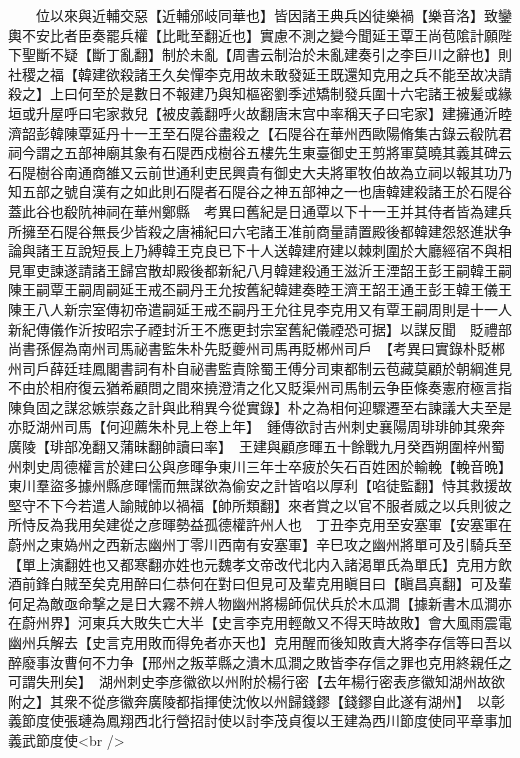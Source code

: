 　　位以來與近輔交惡【近輔邠岐同華也】皆因諸王典兵凶徒樂禍【樂音洛】致鑾輿不安比者臣奏罷兵權【比毗至翻近也】實慮不測之變今聞延王覃王尚苞隂計願陛下聖斷不疑【斷丁亂翻】制於未亂【周書云制治於未亂建奏引之李巨川之辭也】則社稷之福【韓建欲殺諸王久矣憚李克用故未敢發延王既還知克用之兵不能至故决請殺之】上曰何至於是數日不報建乃與知樞密劉季述矯制發兵圍十六宅諸王被髪或緣垣或升屋呼曰宅家救兒【被皮義翻呼火故翻唐末宫中率稱天子曰宅家】建擁通沂睦濟韶彭韓陳覃延丹十一王至石隄谷盡殺之【石隄谷在華州西歐陽脩集古錄云殽阬君祠今謂之五部神廟其象有石隄西戍樹谷五樓先生東臺御史王剪將軍莫曉其義其碑云石隄樹谷南通商雒又云前世通利吏民興貴有御史大夫將軍牧伯故為立祠以報其功乃知五部之號自漢有之如此則石隄者石隄谷之神五部神之一也唐韓建殺諸王於石隄谷蓋此谷也殽阬神祠在華州鄭縣　考異曰舊紀是日通覃以下十一王并其侍者皆為建兵所擁至石隄谷無長少皆殺之唐補紀曰六宅諸王准前商量請置殿後都韓建怨怒進狀争論與諸王互說短長上乃縛韓王克良已下十人送韓建府建以棘刺圍於大廳經宿不與相見軍吏諫遂請諸王歸宫散却殿後都新紀八月韓建殺通王滋沂王湮韶王彭王嗣韓王嗣陳王嗣覃王嗣周嗣延王戒丕嗣丹王允按舊紀韓建奏睦王濟王韶王通王彭王韓王儀王陳王八人新宗室傳初帝遣嗣延王戒丕嗣丹王允往見李克用又有覃王嗣周則是十一人新紀傳儀作沂按昭宗子禋封沂王不應更封宗室舊紀儀禋恐可据】以謀反聞　貶禮部尚書孫偓為南州司馬祕書監朱朴先貶夔州司馬再貶郴州司戶　【考異曰實錄朴貶郴州司戶薛廷珪鳳閣書詞有朴自祕書監責除蜀王傅分司東都制云苞藏莫顧於朝綱進見不由於相府復云猶希顧問之間來撓澄清之化又貶渠州司馬制云争臣條奏憲府極言指陳負固之謀忿嫉崇姦之計與此稍異今從實錄】朴之為相何迎驟遷至右諫議大夫至是亦貶湖州司馬【何迎薦朱朴見上卷上年】　鍾傳欲討吉州刺史襄陽周琲琲帥其衆奔廣陵【琲部凂翻又蒲昧翻帥讀曰率】　王建與顧彦暉五十餘戰九月癸酉朔圍梓州蜀州刺史周德權言於建曰公與彦暉争東川三年士卒疲於矢石百姓困於輸輓【輓音晩】東川羣盜多據州縣彦暉懦而無謀欲為偷安之計皆啗以厚利【啗徒監翻】恃其救援故堅守不下今若遣人諭賊帥以禍福【帥所類翻】來者賞之以官不服者威之以兵則彼之所恃反為我用矣建從之彦暉勢益孤德權許州人也　丁丑李克用至安塞軍【安塞軍在蔚州之東媯州之西新志幽州丁零川西南有安塞軍】辛巳攻之幽州將單可及引騎兵至【單上演翻姓也又都寒翻亦姓也元魏孝文帝改代北内入諸渇單氏為單氏】克用方飲酒前鋒白賊至矣克用醉曰仁恭何在對曰但見可及輩克用瞋目曰【瞋昌真翻】可及輩何足為敵亟命撃之是日大霧不辨人物幽州將楊師侃伏兵於木瓜澗【據新書木瓜澗亦在蔚州界】河東兵大敗失亡大半【史言李克用輕敵又不得天時故敗】會大風雨震電幽州兵解去【史言克用敗而得免者亦天也】克用醒而後知敗責大將李存信等曰吾以醉廢事汝曹何不力争【邢州之叛莘縣之潰木瓜澗之敗皆李存信之罪也克用終親任之可謂失刑矣】　湖州刺史李彦徽欲以州附於楊行密【去年楊行密表彦徽知湖州故欲附之】其衆不從彦徽奔廣陵都指揮使沈攸以州歸錢鏐【錢鏐自此遂有湖州】　以彰義節度使張璉為鳳翔西北行營招討使以討李茂貞復以王建為西川節度使同平章事加義武節度使<br />
